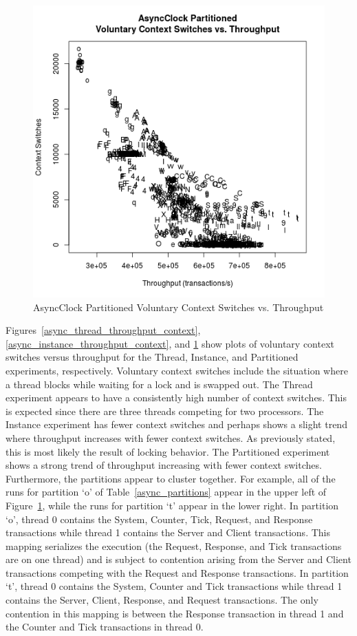 \begin{figure}[H]
\center
\includegraphics[height=.4\textheight]{async_partitioned_throughput_context.png}
\caption{AsyncClock Partitioned Voluntary Context Switches vs. Throughput}
\label{async_partitioned_throughput_context}
\end{figure}

Figures~\ref{async_thread_throughput_context}, \ref{async_instance_throughput_context}, and \ref{async_partitioned_throughput_context} show plots of voluntary context switches versus throughput for the Thread, Instance, and Partitioned experiments, respectively.
Voluntary context switches include the situation where a thread blocks while waiting for a lock and is swapped out.
The Thread experiment appears to have a consistently high number of context switches.
This is expected since there are three threads competing for two processors.
The Instance experiment has fewer context switches and perhaps shows a slight trend where throughput increases with fewer context switches.
As previously stated, this is most likely the result of locking behavior.
The Partitioned experiment shows a strong trend of throughput increasing with fewer context switches.
Furthermore, the partitions appear to cluster together.
For example, all of the runs for partition `o' of Table~\ref{async_partitions} appear in the upper left of Figure~\ref{async_partitioned_throughput_context}, while the runs for partition `t' appear in the lower right.
In partition `o', thread 0 contains the System, Counter, Tick, Request, and Response transactions while thread 1 contains the Server and Client transactions.
This mapping serializes the execution (the Request, Response, and Tick transactions are on one thread) and is subject to contention arising from the Server and Client transactions competing with the Request and Response transactions.
In partition `t', thread 0 contains the System, Counter and Tick transactions while thread 1 contains the Server, Client, Response, and Request transactions.
The only contention in this mapping is between the Response transaction in thread 1 and the Counter and Tick transactions in thread 0.

